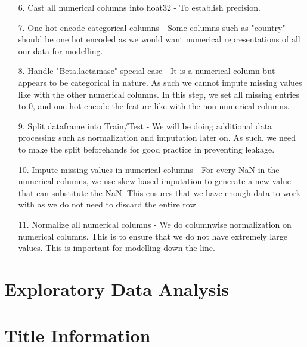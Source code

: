 \documentclass[manuscript,screen,review, nonacm]{acmart}
\begin{document}
\begin{itemize}
        \item[6.] Cast all numerical columns into float32 - To establish precision.
        \item[7.] One hot encode categorical columns - Some columns such as "country" should be one hot encoded as we would want
        numerical representations of all our data for modelling.
        \item[8.] Handle "Beta.lactamase" special case - It is a numerical column but appears to be categorical in nature. As such
        we cannot impute missing values like with the other numerical columns. In this step, we set all missing entries to 0, and
        one hot encode the feature like with the non-numerical columns.
        \item[9.] Split dataframe into Train/Test - We will be doing additional data processing such as normalization and imputation later on.
        As such, we need to make the split beforehands for good practice in preventing leakage.
        \item[10.] Impute missing values in numerical columns - For every NaN in the numerical columns, we use skew based imputation to
        generate a new value that can substitute the NaN. This ensures that we have enough data to work with as we do not need to discard the entire row.
        \item[11.] Normalize all numerical columns - We do columnwise normalization on numerical columns. This is to ensure that we do not have extremely
        large values. This is important for modelling down the line. 

    \end{itemize}



\section{Exploratory Data Analysis}


\section{Title Information}
\end{document}
